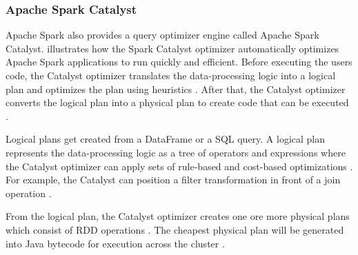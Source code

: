 \subsubsection{Apache Spark Catalyst}
\label{subsubsec:04_spark_pr-model_catalyst}
Apache Spark also provides a query optimizer engine called Apache Spark Catalyst.  illustrates how the Spark Catalyst optimizer automatically optimizes Apache Spark applications to run quickly and efficient.
Before executing the users code, the Catalyst optimizer translates the data-processing logic into a logical plan and optimizes the plan using heuristics \cite{Hien2018Spark}. After that, the Catalyst optimizer converts the logical plan into a physical plan to create code that can be executed \cite{Hien2018Spark}.


Logical plans get created from a DataFrame or a SQL query. A logical plan represents the data-processing logic as a tree of operators and expressions where the Catalyst optimizer can apply sets of rule-based and cost-based optimizations \cite{Hien2018Spark}.
For example, the Catalyst can position a filter transformation in front of a join operation \cite{Hien2018Spark}.

From the logical plan, the Catalyst optimizer creates one ore more physical plans which consist of RDD operations \cite{Chambers2018Spark}. The cheapest physical plan will be generated into Java bytecode for execution across the cluster \cite{Hien2018Spark}.

